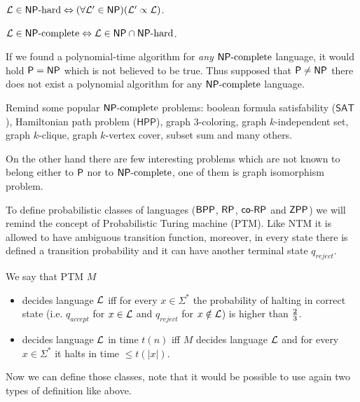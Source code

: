 		\begin{defn}
			${\cal L}\in\NPH \iff (\forall{\cal L'}\in\NP)({\cal L'}\propto{\cal L})$.
		\end{defn}
		
		\begin{defn}
			${\cal L}\in\NPC\iff{\cal L}\in\NP\cap\NPH$.
		\end{defn}
		
		\begin{note}
			If we found a polynomial-time algorithm for {\em any} $\NPC$ language, it would hold $\P=\NP$ which is not believed to be true. Thus supposed that $\P\neq\NP$ there does not exist a polynomial algorithm for any $\NPC$ language.
		\end{note}
		
		\begin{example}\label{exm:npc}
			Remind some popular $\NPC$ problems: boolean formula satisfability ($\mathsf{SAT}$), Hamiltonian path problem ($\mathsf{HPP}$), graph $3$-coloring, graph $k$-independent set, graph $k$-clique, graph $k$-vertex cover, subset sum and many others.
			
			On the other hand there are few interesting problems which are not known to belong either to $\P$ nor to $\NPC$, one of them is graph isomorphism problem.
		\end{example}
		
		
		To define probabilistic classes of languages ($\BPP$, $\RP$, $\coRP$ and $\ZPP$) we will remind the concept of Probabilistic Turing machine (PTM). Like NTM it is allowed to have ambiguous transition function, moreover, in every state there is defined a transition probability and it can have another terminal state $q_{reject}$.
		
		We say that PTM $M$
		\begin{itemize}
			\item decides language $\cal L$ iff for every $x\in\Sigma^*$ the probability of halting in correct state (i.e. $q_{accept}$ for $x\in{\cal L}$ and $q_{reject}$ for $x\notin{\cal L}$) is higher than $\nicefrac{2}{3}$.
			\item decides language $\cal L$ in time $t(n)$ iff $M$ decides language $\cal L$ and for every $x\in\Sigma^*$ it halts in time $\leq t(|x|)$.
		\end{itemize}
		Now we can define those classes, note that it would be possible to use again two types of definition like above.
		
